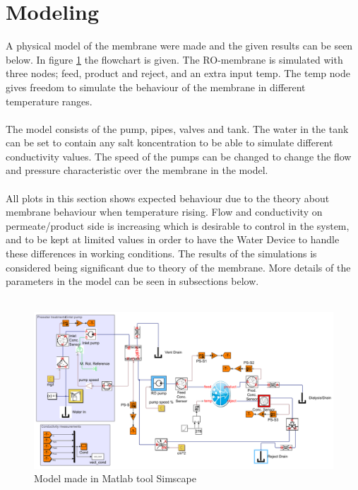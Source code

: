 \section{Modeling}
\label{sec:modres}
A physical model of the membrane were made and the given results can be seen below. In figure \ref{fig:simscape} the flowchart is given. The RO-membrane is simulated with three nodes; feed, product and reject, and an extra input temp. The temp node gives freedom to simulate the behaviour of the membrane in different temperature ranges. \\
\\
The model consists of the pump, pipes, valves and tank. The water in the tank can be set to contain any salt koncentration to be able to simulate different conductivity values. The speed of the pumps can be changed to change the flow and pressure characteristic over the membrane in the model. \\
\\
All plots in this section shows expected behaviour due to the theory about membrane behaviour when temperature rising. Flow and conductivity on permeate/product side is increasing which is desirable to control in the system, and to be kept at limited values in order to have the Water Device to handle these differences in working conditions. The results of the simulations is considered being significant due to theory of the membrane. More details of the parameters in the model can be seen in subsections below.\\
\\
\begin{figure}[h]
\label{fig:simscape}
\centering
\includegraphics[width=\textwidth]{simscape_fc1.PNG}
\caption{Model made in Matlab tool Simscape}
\end{figure}
\newpage


